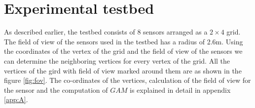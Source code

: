 \section{Experimental testbed}
As described earlier, the testbed consists of 8 sensors arranged as a $2 \times 4$ grid.
The field of view of the sensors used in the testbed has a radius of 2.6m.
Using the coordinates of the vertex of the grid and the field of view of the sensors we can determine the neighboring vertices for every vertex of the grid.
All the vertices of the gird with field of view marked around them are as shown in the figure \ref{fig:fov}. 
The co-ordinates of the vertices, calculation of the field of view for the sensor and the computation of $GAM$ is explained in detail in appendix \ref{app:A}. 




